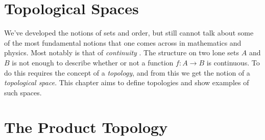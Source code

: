 \begingroup
    \ifcsname\PATH\endcsname
        \newcommand{\PATH}{books/Topology/Point_Set_Topology}
        \newcommand{\OLDPATH}{\PATH}
    \else
        \newcommand{\OLDPATH}{\PATH}
        \renewcommand{\PATH}{books/Topology/Point_Set_Topology}
    \fi
    \chapter{Topological Spaces}
        We've developed the notions of sets and order, but still cannot talk
        about some of the most fundamental notions that one comes across in
        mathematics and physics. Most notably is that of \textit{continuity}%
        . The structure on
        two lone sets $A$ and $B$ is not enough to describe whether or not a
        function $f:A\rightarrow{B}$ is continuous. To do this requires the
        concept of a \textit{topology}, and from this we get the
        notion of a \textit{topological space}. This
        chapter aims to define topologies and show examples of such spaces.
        
    \chapter{The Product Topology}
        
    \renewcommand{\PATH}{\OLDPATH}
\endgroup